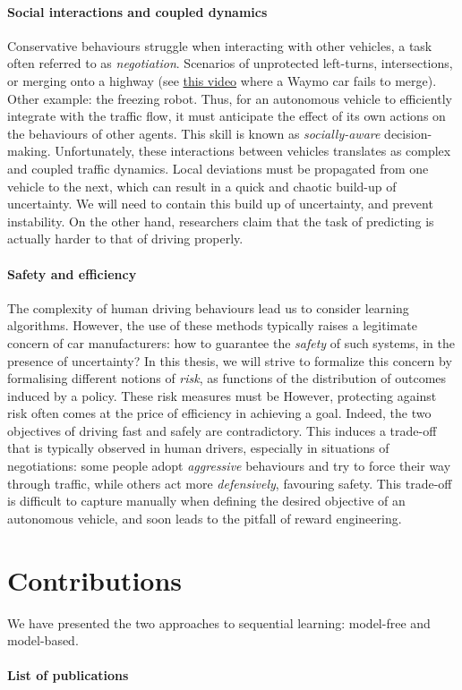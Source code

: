 \paragraph{Social interactions and coupled dynamics}

Conservative behaviours struggle when interacting with other vehicles, a task often referred to as \emph{negotiation}. Scenarios of unprotected left-turns, intersections, or merging onto a highway (see \eg \href{%
	https://www.youtube.com/watch?v=HjtiiGCe1pE}{this video} where a Waymo car fails to merge). Other example: the freezing robot.
Thus, for an autonomous vehicle to efficiently integrate with the traffic flow, it must anticipate the effect of its own actions on the behaviours of other agents. This skill is known as \emph{socially-aware} decision-making. Unfortunately, these interactions between vehicles translates as complex and coupled traffic dynamics. Local deviations must be propagated from one vehicle to the next, which can result in a quick and chaotic build-up of uncertainty. We will need to contain this build up of uncertainty, and prevent instability. On the other hand, researchers claim that the task of predicting is actually harder to that of driving properly.

\paragraph{Safety and efficiency}

The complexity of human driving behaviours lead us to consider learning algorithms. However, the use of these methods typically raises a legitimate concern of car manufacturers: how to guarantee the \emph{safety} of such systems, in the presence of uncertainty? In this thesis, we will strive to formalize this concern by formalising different notions of \emph{risk}, as functions of the distribution of outcomes induced by a policy. These risk measures must be  
However, protecting against risk often comes at the price of efficiency in achieving a goal. Indeed, the two objectives of driving fast and safely are contradictory. This induces a trade-off that is typically observed in human drivers, especially in situations of negotiations: some people adopt \emph{aggressive} behaviours and try to force their way through traffic, while others act more \emph{defensively}, favouring safety. This trade-off is difficult to capture manually when defining the desired objective of an autonomous vehicle, and soon leads to the pitfall of reward engineering.

\section{Contributions}

We have presented the two approaches to sequential learning: model-free and model-based.


\paragraph{List of publications}